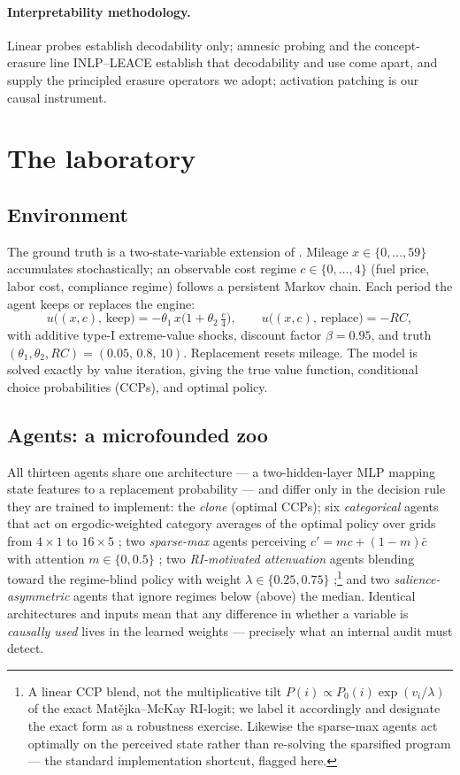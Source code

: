 \documentclass[11pt]{article}
\begin{document}
\paragraph{Interpretability methodology.} Linear probes
\citep{alainbengio2016} establish decodability only; amnesic probing
\citep{elazar2021} and the concept-erasure line INLP--LEACE
\citep{ravfogel2020, belrose2023} establish that decodability and use come
apart, and supply the principled erasure operators we adopt; activation
patching \citep{heimersheimnanda2024} is our causal instrument.

\section{The laboratory}\label{sec:lab}

\subsection{Environment}
The ground truth is a two-state-variable extension of \citet{rust1987}.
Mileage $x \in \{0,\dots,59\}$ accumulates stochastically; an observable
cost regime $c \in \{0,\dots,4\}$ (fuel price, labor cost, compliance
regime) follows a persistent Markov chain. Each period the agent keeps or
replaces the engine:
\[
u\big((x,c),\,\text{keep}\big) = -\theta_1\, x\Big(1 + \theta_2\,
\tfrac{c}{4}\Big), \qquad
u\big((x,c),\,\text{replace}\big) = -RC,
\]
with additive type-I extreme-value shocks, discount factor $\beta = 0.95$,
and truth $(\theta_1, \theta_2, RC) = (0.05,\, 0.8,\, 10)$. Replacement
resets mileage. The model is solved exactly by value iteration, giving the
true value function, conditional choice probabilities (CCPs), and optimal
policy.

\subsection{Agents: a microfounded zoo}
All thirteen agents share one architecture --- a two-hidden-layer MLP
mapping state features to a replacement probability --- and differ only in
the decision rule they are trained to implement:
the \emph{clone} (optimal CCPs); six \emph{categorical} agents that act on
ergodic-weighted category averages of the optimal policy over grids from
$4\times1$ to $16\times5$ \citep{fryerjackson2008}; two \emph{sparse-max}
agents perceiving $c' = m c + (1-m)\bar c$ with attention $m \in \{0, 0.5\}$
\citep{gabaix2014}; two \emph{RI-motivated attenuation} agents blending
toward the regime-blind policy with weight $\lambda \in \{0.25, 0.75\}$
\citep{matejkamckay2015, fosgerau2020};\footnote{A linear CCP blend, not
the multiplicative tilt $P(i) \propto P_0(i)\exp(v_i/\lambda)$ of the exact
Mat\v{e}jka--McKay RI-logit; we label it accordingly and designate the exact
form as a robustness exercise. Likewise the sparse-max agents act optimally
on the perceived state rather than re-solving the sparsified program ---
the standard implementation shortcut, flagged here.} and two
\emph{salience-asymmetric} agents that ignore regimes below (above) the
median. Identical architectures and inputs mean
that any difference in whether a variable is \emph{causally used} lives in
the learned weights --- precisely what an internal audit must detect.
\end{document}
